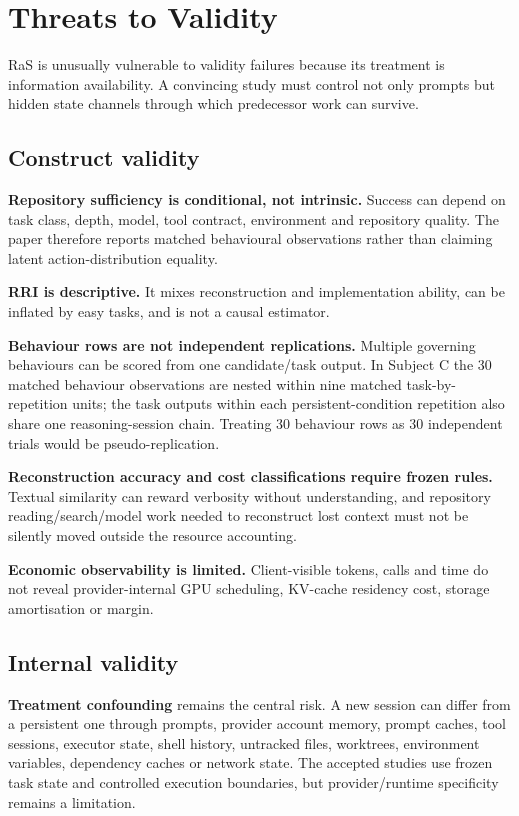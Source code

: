 \section{Threats to Validity}
\label{sec:threats}

RaS is unusually vulnerable to validity failures because its treatment is information availability. A convincing study must control not only prompts but hidden state channels through which predecessor work can survive.

\subsection{Construct validity}

\textbf{Repository sufficiency is conditional, not intrinsic.} Success can depend on task class, depth, model, tool contract, environment and repository quality. The paper therefore reports matched behavioural observations rather than claiming latent action-distribution equality.

\textbf{RRI is descriptive.} It mixes reconstruction and implementation ability, can be inflated by easy tasks, and is not a causal estimator.

\textbf{Behaviour rows are not independent replications.} Multiple governing behaviours can be scored from one candidate/task output. In Subject C the 30 matched behaviour observations are nested within nine matched task-by-repetition units; the task outputs within each persistent-condition repetition also share one reasoning-session chain. Treating 30 behaviour rows as 30 independent trials would be pseudo-replication.

\textbf{Reconstruction accuracy and cost classifications require frozen rules.} Textual similarity can reward verbosity without understanding, and repository reading/search/model work needed to reconstruct lost context must not be silently moved outside the resource accounting.

\textbf{Economic observability is limited.} Client-visible tokens, calls and time do not reveal provider-internal GPU scheduling, KV-cache residency cost, storage amortisation or margin.

\subsection{Internal validity}

\textbf{Treatment confounding} remains the central risk. A new session can differ from a persistent one through prompts, provider account memory, prompt caches, tool sessions, executor state, shell history, untracked files, worktrees, environment variables, dependency caches or network state. The accepted studies use frozen task state and controlled execution boundaries, but provider/runtime specificity remains a limitation.

